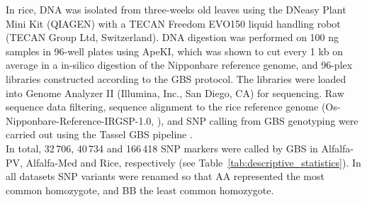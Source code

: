 In rice, DNA was isolated from three-weeks old leaves using the DNeasy Plant Mini Kit (QIAGEN) with a TECAN Freedom EVO150 liquid handling robot (TECAN Group Ltd, Switzerland). DNA digestion was performed on 100 ng samples in 96-well plates using ApeKI, which was shown to cut every 1 kb on average in a in-silico digestion of the Nipponbare reference genome, and 96-plex libraries constructed according to the GBS protocol. The libraries were loaded into Genome Analyzer II (Illumina, Inc., San Diego, CA) for sequencing. Raw sequence data filtering, sequence alignment to the rice reference genome (Os-Nipponbare-Reference-IRGSP-1.0, \cite{kawahara_improvement_2013}), and SNP calling from GBS genotyping were carried out using the Tassel GBS pipeline \cite{glaubitz_tassel-gbs:_2014}.\\
In total, 32\,706, 40\,734 and 166\,418 SNP markers were called by GBS in Alfalfa-PV, Alfalfa-Med and Rice, respectively (see Table~\ref{tab:descriptive_statistics}). In all datasets SNP variants were renamed so that AA represented the most common homozygote, and BB the least common homozygote.

